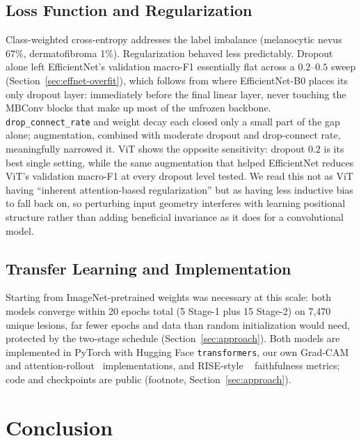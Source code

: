 \documentclass[10pt,twocolumn,letterpaper]{article}
\begin{document}
\subsection{Loss Function and Regularization}

Class-weighted cross-entropy addresses the label imbalance (melanocytic
nevus 67\%, dermatofibroma 1\%). Regularization behaved less predictably.
Dropout alone left EfficientNet's validation macro-F1 essentially flat
across a $0.2$--$0.5$ sweep (Section~\ref{sec:effnet-overfit}), which
follows from where EfficientNet-B0 places its only dropout layer:
immediately before the final linear layer, never touching the MBConv blocks
that make up most of the unfrozen backbone. \texttt{drop\_connect\_rate} and
weight decay each closed only a small part of the gap alone; augmentation,
combined with moderate dropout and drop-connect rate, meaningfully narrowed
it. ViT shows the opposite sensitivity: dropout $0.2$ is its best single
setting, while the same augmentation that helped EfficientNet reduces ViT's
validation macro-F1 at every dropout level tested. We read this not as ViT
having ``inherent attention-based regularization'' but as having less
inductive bias to fall back on, so perturbing input geometry interferes with
learning positional structure rather than adding beneficial invariance as it
does for a convolutional model.

\subsection{Transfer Learning and Implementation}

Starting from ImageNet-pretrained weights was necessary at this scale: both
models converge within 20 epochs total (5 Stage-1 plus 15 Stage-2) on
7{,}470 unique lesions, far fewer epochs and data than random initialization
would need, protected by the two-stage schedule (Section~\ref{sec:approach}).
Both models are implemented in PyTorch with Hugging Face
\texttt{transformers}, our own Grad-CAM~\cite{selvaraju2017gradcam} and
attention-rollout~\cite{abnar2020attention} implementations, and RISE-style
~\cite{petsiuk2018rise} faithfulness metrics; code and checkpoints are public
(footnote, Section~\ref{sec:approach}).

\section{Conclusion}
\label{sec:conclusion}
\end{document}
